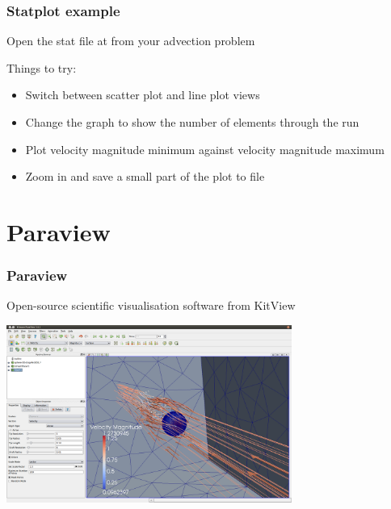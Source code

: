 \documentclass[12pt]{beamer}
\begin{document}
\begin{frame}
    \frametitle{Statplot example}
Open the stat file at from your advection problem

Things to try:
\begin{itemize}
\item Switch between scatter plot and line plot views
\item Change the graph to show the number of elements through the run
\item Plot velocity magnitude minimum against velocity magnitude maximum
\item Zoom in and save a small part of the plot to file
\end{itemize}
\end{frame}


\section{Paraview}
\begin{frame}
    \frametitle{Paraview}
Open-source scientific visualisation software from KitView
\begin{center}
\includegraphics[width=0.7\textwidth]{images/paraview_example.png}
\end{center}
\end{frame}
\end{document}

